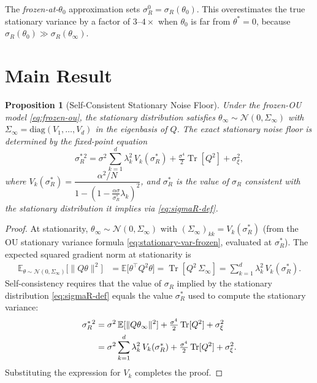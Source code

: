 \documentclass[american]{article}
\newtheorem{proposition}{Proposition}
\begin{document}
The \emph{frozen-at-$\theta_0$} approximation sets $\sigma_R^0 = \sigma_R(\theta_0)$.
This overestimates the true stationary variance by a factor of $3$--$4\times$
when $\theta_0$ is far from $\theta^* = 0$, because $\sigma_R(\theta_0) \gg \sigma_R(\theta_\infty)$.

\section*{Main Result}

\begin{proposition}[Self-Consistent Stationary Noise Floor]
\label{prop:self-consistent}
Under the frozen-OU model \eqref{eq:frozen-ou}, the stationary distribution
satisfies $\theta_\infty \sim \mathcal{N}(0, \Sigma_\infty)$
with $\Sigma_\infty = \mathrm{diag}(V_1,\ldots,V_d)$ in the eigenbasis of $Q$.
The exact stationary noise floor is determined by the fixed-point equation
\begin{equation}
    \boxed{
    \sigma_R^{*\,2}
    = \sigma^2 \sum_{k=1}^d \lambda_k^2\, V_k(\sigma_R^*)
    + \tfrac{\sigma^4}{2}\operatorname{Tr}[Q^2]
    + \sigma_\xi^2,
    }
    \label{eq:self-consistent}
\end{equation}
where $V_k(\sigma_R^*) = \dfrac{\alpha^2/N}{1-(1-\frac{\alpha\sigma}{\sigma_R^*}\lambda_k)^2}$,
and $\sigma_R^*$ is the value of $\sigma_R$ consistent with the stationary distribution
it implies via \eqref{eq:sigmaR-def}.
\end{proposition}

\begin{proof}
At stationarity, $\theta_\infty \sim \mathcal{N}(0, \Sigma_\infty)$ with
$(\Sigma_\infty)_{kk} = V_k(\sigma_R^*)$ (from the OU stationary variance formula
\eqref{eq:stationary-var-frozen}, evaluated at $\sigma_R^*$).
The expected squared gradient norm at stationarity is
\begin{align}
    \mathbb{E}_{\theta \sim \mathcal{N}(0,\Sigma_\infty)}\bigl[\|Q\theta\|^2\bigr]
    &= \mathbb{E}\bigl[\theta^\top Q^2\theta\bigr]
    = \operatorname{Tr}[Q^2\,\Sigma_\infty]
    = \sum_{k=1}^d \lambda_k^2\, V_k(\sigma_R^*).
    \label{eq:E-Qtheta-squared}
\end{align}
Self-consistency requires that the value of $\sigma_R$ implied by the stationary
distribution \eqref{eq:sigmaR-def} equals the value $\sigma_R^*$ used to compute
the stationary variance:
\begin{align}
    \sigma_R^{*\,2}
    &= \sigma^2\,\mathbb{E}[\|Q\theta_\infty\|^2]
     + \tfrac{\sigma^4}{2}\operatorname{Tr}[Q^2]
     + \sigma_\xi^2 \notag \\
    &= \sigma^2 \sum_{k=1}^d \lambda_k^2\, V_k(\sigma_R^*)
     + \tfrac{\sigma^4}{2}\operatorname{Tr}[Q^2]
     + \sigma_\xi^2.
\end{align}
Substituting the expression for $V_k$ completes the proof.
\end{proof}
\end{document}
